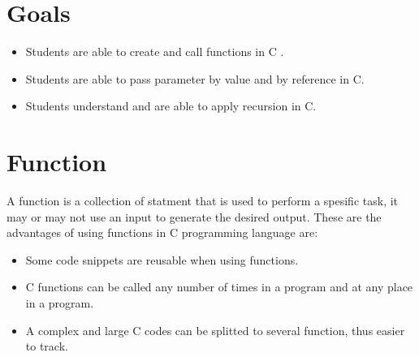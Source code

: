 \section{Goals}
\begin{itemize}[label=$\bullet$, itemsep=-1pt, leftmargin=*]
    \item Students are able to create and call functions in C .
    \item Students are able to pass parameter by value and by reference in C.
    \item Students understand and are able to apply recursion in C. 
    
\end{itemize}

\section{Function}
A function is a collection of statment that is used to perform a spesific task, it may or may not use an input to generate the desired output.
These are the advantages of using functions in C programming language are:
\begin{itemize}
	\item Some code snippets are reusable when using functions. 
    \item C functions can be called any number of times in a program and at any place in a program.
    \item A complex and large C codes can be splitted to several function, thus easier to track.
\end{itemize}
